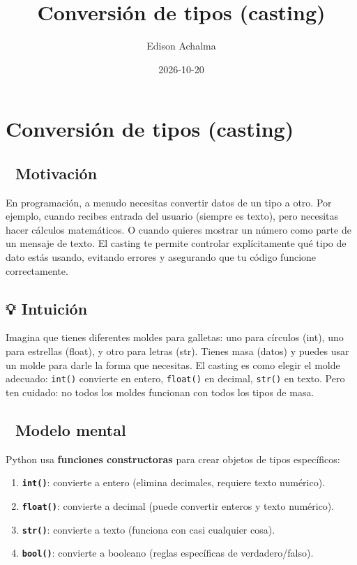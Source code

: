 \documentclass[
  doc,
  floatsintext,
  longtable,
  a4paper,
  nolmodern,
  notxfonts,
  notimes,
  12pt,
  colorlinks=true,linkcolor=blue,citecolor=blue,urlcolor=blue]{apa7}
\title{Conversión de tipos (casting)}
\author{Edison Achalma}
\affiliation{
{Escuela Profesional de Economía, Universidad Nacional de San Cristóbal
de Huamanga}}
\date{2026-10-20}
\providecommand{\tightlist}{%
  \setlength{\itemsep}{0pt}\setlength{\parskip}{0pt}}
\begin{document}
\maketitle


\hypertarget{toc}{}
\tableofcontents
\newpage
\section[Introduction]{Conversión de tipos (casting)}

\setcounter{secnumdepth}{3}

\setlength\LTleft{0pt}




\subsection{🎯 Motivación}\label{motivaciuxf3n}

En programación, a menudo necesitas convertir datos de un tipo a otro.
Por ejemplo, cuando recibes entrada del usuario (siempre es texto), pero
necesitas hacer cálculos matemáticos. O cuando quieres mostrar un número
como parte de un mensaje de texto. El casting te permite controlar
explícitamente qué tipo de dato estás usando, evitando errores y
asegurando que tu código funcione correctamente.

\subsection{💡 Intuición}\label{intuiciuxf3n}

Imagina que tienes diferentes moldes para galletas: uno para círculos
(int), uno para estrellas (float), y otro para letras (str). Tienes masa
(datos) y puedes usar un molde para darle la forma que necesitas. El
casting es como elegir el molde adecuado: \texttt{int()} convierte en
entero, \texttt{float()} en decimal, \texttt{str()} en texto. Pero ten
cuidado: no todos los moldes funcionan con todos los tipos de masa.

\subsection{🧠 Modelo mental}\label{modelo-mental}

Python usa \textbf{funciones constructoras} para crear objetos de tipos
específicos:

\begin{enumerate}
\def\labelenumi{\arabic{enumi}.}
\tightlist
\item
  \textbf{\texttt{int()}}: convierte a entero (elimina decimales,
  requiere texto numérico).
\item
  \textbf{\texttt{float()}}: convierte a decimal (puede convertir
  enteros y texto numérico).
\item
  \textbf{\texttt{str()}}: convierte a texto (funciona con casi
  cualquier cosa).
\item
  \textbf{\texttt{bool()}}: convierte a booleano (reglas específicas de
  verdadero/falso).
\end{enumerate}
\end{document}
